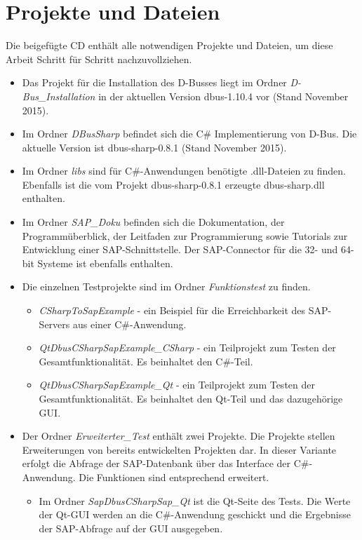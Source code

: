 \section{Projekte und Dateien}
Die beigefügte CD enthält alle notwendigen Projekte und Dateien, um diese Arbeit Schritt für Schritt nachzuvollziehen. 
\begin{itemize}
	\setlength{\itemsep}{-10pt}
	\item Das Projekt für die Installation des D-Busses liegt im Ordner \textit{D-Bus\_Installation} in der aktuellen Version dbus-1.10.4 vor (Stand November 2015).
	\item Im Ordner \textit{DBusSharp} befindet sich die C\# Implementierung von D-Bus. Die aktuelle Version ist dbus-sharp-0.8.1 (Stand November 2015).
	\item Im Ordner \textit{libs} sind für C\#-Anwendungen benötigte .dll-Dateien zu finden. Ebenfalls ist die vom Projekt dbus-sharp-0.8.1 erzeugte dbus-sharp.dll enthalten.
	\item Im Ordner \textit{SAP\_Doku} befinden sich die Dokumentation, der Programmüberblick, der Leitfaden zur Programmierung sowie Tutorials zur Entwicklung einer SAP-Schnittstelle. Der SAP-Connector für die 32- und 64-bit Systeme ist ebenfalls enthalten.
	\item Die einzelnen Testprojekte sind im Ordner \textit{Funktionstest} zu finden.
	\begin{itemize}
		\setlength{\itemsep}{-10pt}
		\item \textit{CSharpToSapExample} - ein Beispiel für die Erreichbarkeit des SAP-Servers aus einer C\#-Anwendung.
		\item \textit{QtDbusCSharpSapExample\_CSharp} - ein Teilprojekt zum Testen der Gesamtfunktionalität. Es beinhaltet den C\#-Teil.
		\item  \textit{QtDbusCSharpSapExample\_Qt} - ein Teilprojekt zum Testen der Gesamtfunktionalität. Es beinhaltet den Qt-Teil und das dazugehörige GUI.
	\end{itemize}
	\item Der Ordner \textit{Erweiterter\_Test} enthält zwei Projekte. Die Projekte stellen  Erweiterungen von bereits entwickelten Projekten dar. In dieser Variante erfolgt die Abfrage der SAP-Datenbank über das Interface der C\#-Anwendung. Die Funktionen sind entsprechend erweitert.
	\begin{itemize}
		\setlength{\itemsep}{-10pt}
		\item Im Ordner \textit{SapDbusCSharpSap\_Qt} ist die Qt-Seite des Tests. Die Werte der Qt-GUI werden an die C\#-Anwendung geschickt und die Ergebnisse der SAP-Abfrage auf der GUI ausgegeben. 

\end{itemize}
\end{itemize}
